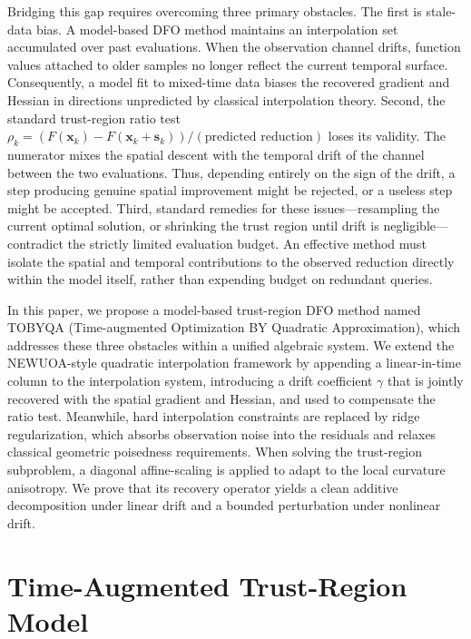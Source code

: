 \documentclass[11pt,a4paper]{article}
\begin{document}
Bridging this gap requires overcoming three primary obstacles. The first is stale-data bias. A model-based DFO method maintains an interpolation set accumulated over past evaluations. When the observation channel drifts, function values attached to older samples no longer reflect the current temporal surface. Consequently, a model fit to mixed-time data biases the recovered gradient and Hessian in directions unpredicted by classical interpolation theory. Second, the standard trust-region ratio test $\rho_k = (F(\bm{x}_k)-F(\bm{x}_k+\bm{s}_k))/(\text{predicted reduction})$ loses its validity. The numerator mixes the spatial descent with the temporal drift of the channel between the two evaluations. Thus, depending entirely on the sign of the drift, a step producing genuine spatial improvement might be rejected, or a useless step might be accepted. Third, standard remedies for these issues---resampling the current optimal solution, or shrinking the trust region until drift is negligible---contradict the strictly limited evaluation budget. An effective method must isolate the spatial and temporal contributions to the observed reduction directly within the model itself, rather than expending budget on redundant queries.

In this paper, we propose a model-based trust-region DFO method named TOBYQA (Time-augmented Optimization BY Quadratic Approximation), which addresses these three obstacles within a unified algebraic system. We extend the NEWUOA-style quadratic interpolation framework by appending a linear-in-time column to the interpolation system, introducing a drift coefficient $\gamma$ that is jointly recovered with the spatial gradient and Hessian, and used to compensate the ratio test. Meanwhile, hard interpolation constraints are replaced by ridge regularization, which absorbs observation noise into the residuals and relaxes classical geometric poisedness requirements. When solving the trust-region subproblem, a diagonal affine-scaling is applied to adapt to the local curvature anisotropy. We prove that its recovery operator yields a clean additive decomposition under linear drift and a bounded perturbation under nonlinear drift.


\section{Time-Augmented Trust-Region Model}
\label{sec:soft-constraint}
\end{document}
